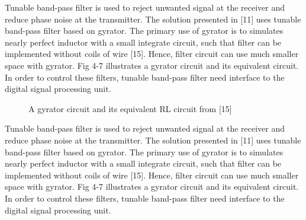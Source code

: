 \documentclass[conference]{IEEEtran}
\begin{document}
Tunable band-pass filter is used to reject unwanted signal at the receiver and reduce phase noise at the transmitter. The solution presented in [11] uses tunable band-pass filter based on gyrator. The primary use of gyrator is to simulates nearly perfect inductor with a small integrate circuit, such that filter can be implemented without coils of wire [15].  Hence, filter circuit can use much smaller space with gyrator. Fig 4-7 illustrates a gyrator circuit and its equivalent circuit. In order to control these filters, tunable band-pass filter need interface to the digital signal processing unit. 

\begin{figure}[h!]
	\centering
	\caption{A gyrator circuit and its equivalent RL circuit from [15]}
\end{figure}

Tunable band-pass filter is used to reject unwanted signal at the receiver and reduce phase noise at the transmitter. The solution presented in [11] uses tunable band-pass filter based on gyrator. The primary use of gyrator is to simulates nearly perfect inductor with a small integrate circuit, such that filter can be implemented without coils of wire [15].  Hence, filter circuit can use much smaller space with gyrator. Fig 4-7 illustrates a gyrator circuit and its equivalent circuit. In order to control these filters, tunable band-pass filter need interface to the digital signal processing unit. 


%
%
\end{document}

